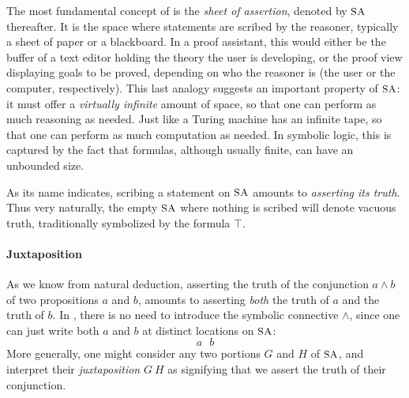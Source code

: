 The most fundamental concept of  is the \emph{sheet of assertion},
denoted by $\small\textsc{SA}$ thereafter. It is the space where statements are scribed by the
reasoner, typically a sheet of paper or a blackboard. In a proof assistant, this
would either be the buffer of a text editor holding the theory the user is
developing, or the proof view displaying goals to be proved, depending on who
the reasoner is (the user or the computer, respectively). This last analogy
suggests an important property of $\small\textsc{SA}$: it must offer a \emph{virtually
infinite} amount of space, so that one can perform as much reasoning as needed.
Just like a Turing machine has an infinite tape, so that one can perform as much
computation as needed. In symbolic logic, this is captured by the fact that
formulas, although usually finite, can have an unbounded size.

As its name indicates, scribing a statement on $\small\textsc{SA}$ amounts to \emph{asserting
its truth}. Thus very naturally, the empty $\small\textsc{SA}$ where nothing is scribed will
denote vacuous truth, traditionally symbolized by the formula
$\top$.


\paragraph{Juxtaposition}

As we know from natural deduction, asserting the truth of the conjunction $a
\land b$ of two propositions $a$ and $b$, amounts to asserting \emph{both} the
truth of $a$ and the truth of $b$. In , there is no need to introduce
the symbolic connective $\land$, since one can just write both $a$ and $b$ at
distinct locations on $\small\textsc{SA}$:
$$a~~~b$$
More generally, one might consider any two portions $G$ and $H$ of $\small\textsc{SA}$, and
interpret their \emph{juxtaposition} $G~H$ as signifying that we assert the
truth of their conjunction.

